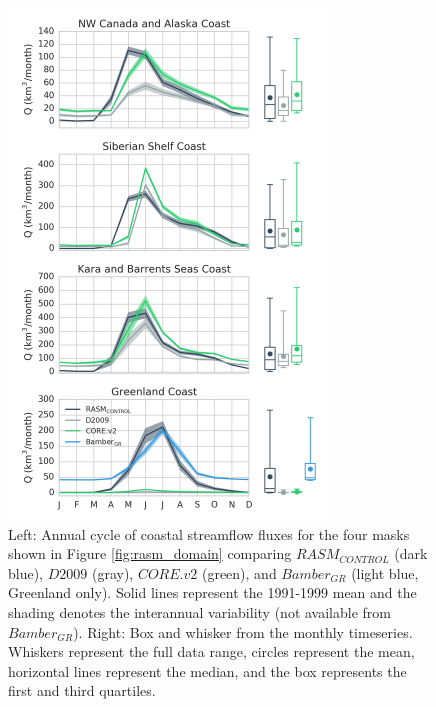 \documentclass[jgrga, draft]{agutex}
\begin{document}
\clearpage
\begin{figure}
\noindent\includegraphics[width=20pc,natwidth=1]{coastal_hydrographs}
\caption{Left: Annual cycle of coastal streamflow fluxes for the four masks shown in Figure \ref{fig:rasm_domain} comparing $RASM_{CONTROL}$ (dark blue), $D2009$ (gray), $CORE.v2$ (green), and $Bamber_{GR}$ (light blue, Greenland only).
Solid lines represent the 1991-1999 mean and the shading denotes the interannual variability (not available from $Bamber_{GR}$).
Right: Box and whisker from the monthly timeseries.
Whiskers represent the full data range, circles represent the mean, horizontal lines represent the median, and the box represents the first and third quartiles.
}
\label{fig:coastal_hydrographs}
\end{figure}
\end{document}
